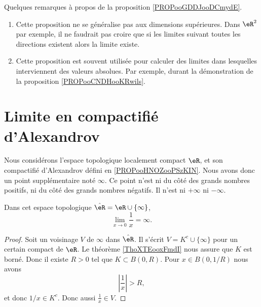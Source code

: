 \begin{normaltext}
	Quelques remarques à propos de la proposition \ref{PROPooGDDJooDCmydE}.
	\begin{enumerate}
		\item
		      Cette proposition ne se généralise pas aux dimensions supérieures. Dans \( \eR^2\) par exemple, il ne faudrait pas croire que si les limites suivant toutes les directions existent alors la limite existe.
		\item
		      Cette proposition est souvent utilisée pour calculer des limites dans lesquelles interviennent des valeurs absolues. Par exemple, durant la démonstration de la proposition \ref{PROPooCNDHooKRwils}.
	\end{enumerate}
\end{normaltext}

\section{Limite en compactifié d'Alexandrov}

Nous considérons l'espace topologique localement compact \( \eR\), et son compactifié d'Alexandrov défini en \ref{PROPooHNOZooPSzKIN}. Nous avons donc un point supplémentaire noté \( \infty\). Ce point n'est ni du côté des grands nombres positifs, ni du côté des grands nombres négatifs. Il n'est ni \( +\infty\) ni \( -\infty\).

\begin{proposition}
	Dans cet espace topologique \( \hat \eR=\eR\cup\{ \infty \}\),
	\begin{equation}
		\lim_{x\to 0} \frac{1}{ x }=\infty.
	\end{equation}
\end{proposition}

\begin{proof}
	Soit un voisinage \( V\) de \( \infty\) dans \( \hat \eR\). Il s'écrit \( V=K^c\cup\{ \infty \}\) pour un certain compact de \( \eR\). Le théorème \ref{ThoXTEooxFmdI} nous assure que \( K\) est borné. Donc il existe \( R>0\) tel que \( K\subset B(0,R)\). Pour \( x\in B(0,1/R)\) nous avons
	\begin{equation}
		\left| \frac{1}{ x } \right|>R,
	\end{equation}
	et donc \( 1/x\in K^c\). Donc aussi \( \frac{1}{ x }\in V\).
\end{proof}


